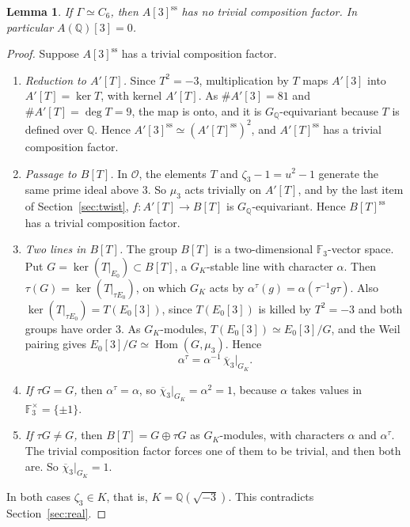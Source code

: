 \documentclass[11pt]{article}
\newtheorem{lemma}{Lemma}
\newcommand{\Q}{\mathbb Q}
\newcommand{\F}{\mathbb F}
\DeclareMathOperator{\Hom}{Hom}
\begin{document}
\begin{lemma}\label{lem:sextic}
If \(\Gamma\simeq C_6\), then \(A[3]^{\mathrm{ss}}\) has no trivial
composition factor. In particular \(A(\Q)[3]=0\).
\end{lemma}

\begin{proof}
Suppose \(A[3]^{\mathrm{ss}}\) has a trivial composition factor.
\begin{enumerate}
\item \emph{Reduction to \(A'[T]\).} Since \(T^2=-3\), multiplication by
\(T\) maps \(A'[3]\) into \(A'[T]=\ker T\), with kernel \(A'[T]\). As
\(\#A'[3]=81\) and \(\#A'[T]=\deg T=9\), the map is onto, and it is
\(G_{\Q}\)-equivariant because \(T\) is defined over \(\Q\). Hence
\(A'[3]^{\mathrm{ss}}\simeq(A'[T]^{\mathrm{ss}})^{2}\), and
\(A'[T]^{\mathrm{ss}}\) has a trivial composition factor.
\item \emph{Passage to \(B[T]\).} In \(\mathcal O\), the elements \(T\)
and \(\zeta_3-1=u^2-1\) generate the same prime ideal above \(3\). So
\(\mu_3\) acts trivially on \(A'[T]\), and by the last item of
Section~\ref{sec:twist}, \(f:A'[T]\to B[T]\) is \(G_{\Q}\)-equivariant.
Hence \(B[T]^{\mathrm{ss}}\) has a trivial composition factor.
\item \emph{Two lines in \(B[T]\).} The group \(B[T]\) is a
two-dimensional \(\F_3\)-vector space. Put
\(G=\ker(T|_{E_0})\subset B[T]\), a \(G_K\)-stable line with character
\(\alpha\). Then \(\tau(G)=\ker(T|_{\tau E_0})\), on which \(G_K\) acts
by \(\alpha^\tau(g)=\alpha(\tau^{-1}g\tau)\). Also
\(\ker(T|_{\tau E_0})=T(E_0[3])\), since \(T(E_0[3])\) is killed by
\(T^2=-3\) and both groups have order \(3\). As \(G_K\)-modules,
\(T(E_0[3])\simeq E_0[3]/G\), and the Weil pairing gives
\(E_0[3]/G\simeq\Hom(G,\mu_3)\). Hence
\[
 \alpha^\tau=\alpha^{-1}\,\overline\chi_3|_{G_K}.
\]
\item \emph{If \(\tau G=G\),} then \(\alpha^\tau=\alpha\), so
\(\overline\chi_3|_{G_K}=\alpha^2=1\), because \(\alpha\) takes values
in \(\F_3^\times=\{\pm1\}\).
\item \emph{If \(\tau G\neq G\),} then \(B[T]=G\oplus\tau G\) as
\(G_K\)-modules, with characters \(\alpha\) and \(\alpha^\tau\). The
trivial composition factor forces one of them to be trivial, and then
both are. So \(\overline\chi_3|_{G_K}=1\).
\end{enumerate}
In both cases \(\zeta_3\in K\), that is, \(K=\Q(\sqrt{-3})\). This
contradicts Section~\ref{sec:real}.
\end{proof}
\end{document}
